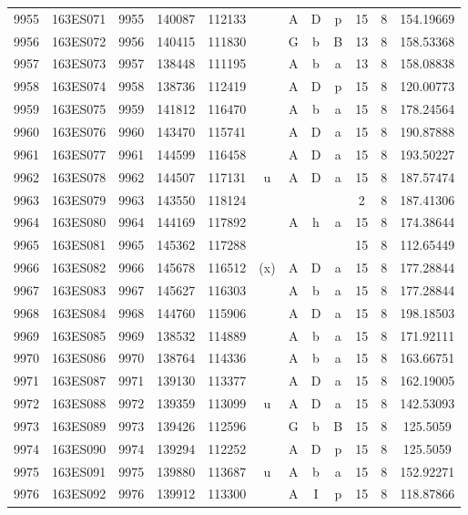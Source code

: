 \begin{tabular}{|*{12}{c|}}
9955 & 163ES071 & 9955 & 140087 & 112133 &  & A & D & p & 15 & 8 & 154.19669 \\ 
9956 & 163ES072 & 9956 & 140415 & 111830 &  & G & b & B & 13 & 8 & 158.53368 \\ 
9957 & 163ES073 & 9957 & 138448 & 111195 &  & A & b & a & 13 & 8 & 158.08838 \\ 
9958 & 163ES074 & 9958 & 138736 & 112419 &  & A & D & p & 15 & 8 & 120.00773 \\ 
9959 & 163ES075 & 9959 & 141812 & 116470 &  & A & b & a & 15 & 8 & 178.24564 \\ 
9960 & 163ES076 & 9960 & 143470 & 115741 &  & A & D & a & 15 & 8 & 190.87888 \\ 
9961 & 163ES077 & 9961 & 144599 & 116458 &  & A & D & a & 15 & 8 & 193.50227 \\ 
9962 & 163ES078 & 9962 & 144507 & 117131 & u & A & D & a & 15 & 8 & 187.57474 \\ 
9963 & 163ES079 & 9963 & 143550 & 118124 &  &  &  &  & 2 & 8 & 187.41306 \\ 
9964 & 163ES080 & 9964 & 144169 & 117892 &  & A & h & a & 15 & 8 & 174.38644 \\ 
9965 & 163ES081 & 9965 & 145362 & 117288 &  &  &  &  & 15 & 8 & 112.65449 \\ 
9966 & 163ES082 & 9966 & 145678 & 116512 & (x) & A & D & a & 15 & 8 & 177.28844 \\ 
9967 & 163ES083 & 9967 & 145627 & 116303 &  & A & b & a & 15 & 8 & 177.28844 \\ 
9968 & 163ES084 & 9968 & 144760 & 115906 &  & A & D & a & 15 & 8 & 198.18503 \\ 
9969 & 163ES085 & 9969 & 138532 & 114889 &  & A & b & a & 15 & 8 & 171.92111 \\ 
9970 & 163ES086 & 9970 & 138764 & 114336 &  & A & b & a & 15 & 8 & 163.66751 \\ 
9971 & 163ES087 & 9971 & 139130 & 113377 &  & A & D & a & 15 & 8 & 162.19005 \\ 
9972 & 163ES088 & 9972 & 139359 & 113099 & u & A & D & a & 15 & 8 & 142.53093 \\ 
9973 & 163ES089 & 9973 & 139426 & 112596 &  & G & b & B & 15 & 8 & 125.5059 \\ 
9974 & 163ES090 & 9974 & 139294 & 112252 &  & A & D & p & 15 & 8 & 125.5059 \\ 
9975 & 163ES091 & 9975 & 139880 & 113687 & u & A & b & a & 15 & 8 & 152.92271 \\ 
9976 & 163ES092 & 9976 & 139912 & 113300 &  & A & I & p & 15 & 8 & 118.87866 \\ 

\end{tabular}
